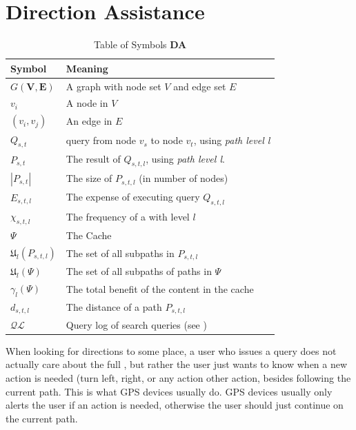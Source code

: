 \section{Direction Assistance}


\begin{table}
\begin{tabular*}{\columnwidth}{|l|p{}|}
\hline
\bf Symbol		& \bf Meaning \\\hline
$G\mathbf{(V,E)}$ 	& A graph with node set $V$ and edge set $E$ \\\hline 
$v_i$			& A node in $V$ \\\hline 
$(v_i,v_j)$		& An edge in $E$ \\\hline 

$Q_{s,t}$		& \spath query from node $v_s$ to node $v_t$, using \textit{path level l}\\\hline
$P_{s,t}$		& The \spath result of $Q_{s,t,l}$, using \textit{path level l}. \\\hline
$|P_{s,t}|$		& The size of $P_{s,t,l}$ (in number of nodes) \\\hline
$E_{s,t,l}$		& The expense of executing query $Q_{s,t,l}$ \\\hline
$\chi_{s,t,l}$		& The frequency of a \spath with level $l$ \\\hline
$\Psi$ 			& The Cache \\\hline
$\mathfrak{U}_l(P_{s,t,l})$& The set of all subpaths in $P_{s,t,l}$ \\\hline
$\mathfrak{U}_l(\Psi)$	& The set of all subpaths of paths in $\Psi$ \\\hline
$\gamma_l(\Psi)$	& The total benefit of the content in the cache \\\hline

$d_{s,t,l}$		& The \spath distance of a path $P_{s,t,l}$ \\\hline

$\mathcal{QL}$		& Query log of search queries (see \cite{thomsen2012}) \\\hline
\end{tabular*}
\caption{Table of Symbols \textbf{DA}}
\label{tab:symbols}
\end{table}

When looking for directions to some place, a user who issues a \spath query does not actually care about the full \spathns\cite{sigmodTaoSP11}, but rather the user just wants to know when a new action is needed (turn left, right, or any action other action, besides following the current path. This is what GPS devices usually do. GPS devices usually only alerts the user if an action is needed, otherwise the user should just continue on the current path.


